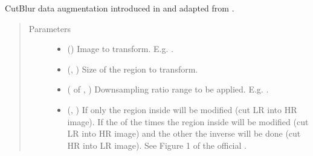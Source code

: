 \documentclass[letterpaper,10pt,english]{sphinxmanual}
\begin{document}

\begin{fulllineitems}
\label{\detokenize{data/generators/augmentors:data.generators.augmentors.cutblur}}
CutBlur data augmentation introduced in  and adapted from
 .
\begin{quote}\begin{description}
\item[{Parameters}] \leavevmode\begin{itemize}
\item {} 
 () \textendash{} Image to transform. E.g. .

\item {} 
 (, ) \textendash{} Size of the region to transform.

\item {} 
 ( of , ) \textendash{} Downsampling ratio range to be applied. E.g. .

\item {} 
 (, ) \textendash{} If  only the region inside will be modified (cut LR into HR image). If  the  of the
times the region inside will be modified (cut LR into HR image) and the other  the inverse will be
done (cut HR into LR image). See Figure 1 of the official .


\end{itemize}
\end{description}
\end{quote}
\end{fulllineitems}
\end{document}
